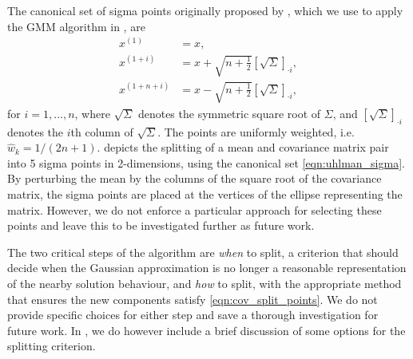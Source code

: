 The canonical set of sigma points originally proposed by \citet{Uhlmann_1995_DynamicMapBuilding}, which we use to apply the GMM algorithm in , are
\begin{subequations}\label{eqn:uhlman_sigma}
	\begin{align}
		x^{(1)}         & = x,                                                          \\
		x^{(1 + i)}     & = x + \sqrt{n + \frac12}\left[\sqrt{\Sigma}\right]_{\cdot i}, \\
		x^{(1 + n + i)} & = x - \sqrt{n + \frac12}\left[\sqrt{\Sigma}\right]_{\cdot i},
	\end{align}
\end{subequations}
for \(i = 1,\dotsc, n\), where \(\sqrt{\Sigma}\) denotes the symmetric square root of \(\Sigma\), and \(\left[\sqrt{\Sigma}\right]_{\cdot i}\) denotes the \(i\)th column of \(\sqrt{\Sigma}\).
The points are uniformly weighted, i.e.\ \(\hat{w}_k = 1 / (2n + 1)\).
 depicts the splitting of a mean and covariance matrix pair into 5 sigma points in 2-dimensions, using the canonical set \cref{eqn:uhlman_sigma}.
By perturbing the mean by the columns of the square root of the covariance matrix, the sigma points are placed at the vertices of the ellipse representing the matrix.
However, we do not enforce a particular approach for selecting these points and leave this to be investigated further as future work.

The two critical steps of the algorithm are \emph{when} to split, a criterion that should decide when the Gaussian approximation is no longer a reasonable representation of the nearby solution behaviour, and \emph{how} to split, with the appropriate method that ensures the new components satisfy \cref{eqn:cov_split_points}.
We do not provide specific choices for either step and save a thorough investigation for future work.
In , we do however include a brief discussion of some options for the splitting criterion.

